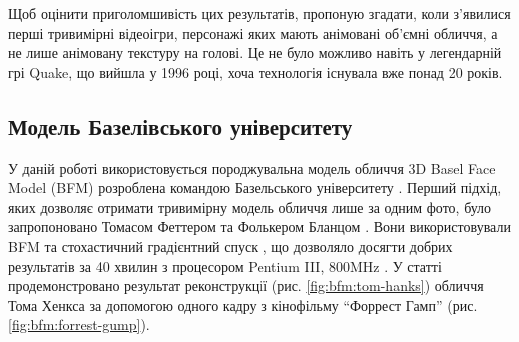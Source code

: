 Щоб оцінити приголомшивість цих результатів, пропоную згадати,
коли з'явилися перші тривимірні відеоігри,
персонажі яких мають анімовані об'ємні обличчя,
а не лише анімовану текстуру на голові.
Це не було можливо навіть у легендарній грі Quake,
що вийшла у 1996 році, хоча технологія існувала вже понад 20 років.

\subsection{Модель Базелівського університету}

У даній роботі використовується породжувальна модель обличчя
3D Basel Face Model (BFM)
розроблена командою Базельського університету
\cite{bfm09}.
Перший підхід,
яких дозволяє отримати тривимірну модель обличчя лише за одним фото,
було запропоновано Томасом Феттером та Фолькером Бланцом
\cite{blanz:vetter:1999}.
Вони використовували BFM та стохастичний градієнтний спуск \cite{sgd:1998},
що дозволяло досягти добрих результатів за 40 хвилин з процесором
Pentium III, 800MHz \cite{blanz:romdhani:vetter}.
У статті продемонстровано результат реконструкції (рис. \ref{fig:bfm:tom-hanks})
обличчя Тома Хенкса за допомогою одного кадру з кінофільму ``Форрест Гамп''
(рис. \ref{fig:bfm:forrest-gump}).
